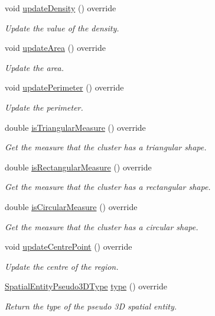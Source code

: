 \begin{DoxyCompactItemize}
void \hyperlink{classmultiscale_1_1analysis_1_1Region_a995bd4ac0452715ec75bdb8c6ae51914}{update\-Density} () override
\begin{DoxyCompactList}\small\item\em Update the value of the density. \end{DoxyCompactList}\item 
void \hyperlink{classmultiscale_1_1analysis_1_1Region_a88adaf10fae7c554581498f86f1863fa}{update\-Area} () override
\begin{DoxyCompactList}\small\item\em Update the area. \end{DoxyCompactList}\item 
void \hyperlink{classmultiscale_1_1analysis_1_1Region_a58a4a22cb77fc6963592ec156458f310}{update\-Perimeter} () override
\begin{DoxyCompactList}\small\item\em Update the perimeter. \end{DoxyCompactList}\item 
double \hyperlink{classmultiscale_1_1analysis_1_1Region_acb88d149b42eee5225e7197a225d31c3}{is\-Triangular\-Measure} () override
\begin{DoxyCompactList}\small\item\em Get the measure that the cluster has a triangular shape. \end{DoxyCompactList}\item 
double \hyperlink{classmultiscale_1_1analysis_1_1Region_a2310c3e3c6f1dea310e14e46d466a204}{is\-Rectangular\-Measure} () override
\begin{DoxyCompactList}\small\item\em Get the measure that the cluster has a rectangular shape. \end{DoxyCompactList}\item 
double \hyperlink{classmultiscale_1_1analysis_1_1Region_aa59dcbe337f4db849d66cb3902617ccd}{is\-Circular\-Measure} () override
\begin{DoxyCompactList}\small\item\em Get the measure that the cluster has a circular shape. \end{DoxyCompactList}\item 
void \hyperlink{classmultiscale_1_1analysis_1_1Region_a3753b8789a73c1e3b5d189aa710aec86}{update\-Centre\-Point} () override
\begin{DoxyCompactList}\small\item\em Update the centre of the region. \end{DoxyCompactList}\item 
\hyperlink{namespacemultiscale_1_1analysis_a6db9cbf10615e77e300c3e4cb1c56660}{Spatial\-Entity\-Pseudo3\-D\-Type} \hyperlink{classmultiscale_1_1analysis_1_1Region_a7cac0117120ae96e40f5c7eec8266922}{type} () override
\begin{DoxyCompactList}\small\item\em Return the type of the pseudo 3\-D spatial entity. \end{DoxyCompactList}\end{DoxyCompactItemize}
